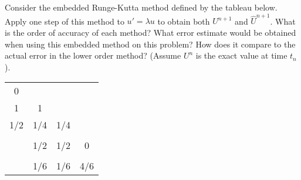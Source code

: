 

Consider the embedded Runge-Kutta method defined by the tableau below.
Apply one step of this method to 
$u' = \lambda u$ to obtain both $U^{n+1}$ and $\hat U^{n+1}$.  What is the
order of accuracy of each method?  What error estimate would be obtained
when using this embedded method on this problem?  How does it compare to the
actual error in the lower order method?  (Assume $U^n$ is the exact value at
time $t_n$).

\begin{center}
\begin{tabular}{c|ccc}
0\\
1&1\\
1/2&1/4&1/4\\
\hline\\
&1/2&1/2&0\\
\hline\\
&1/6&1/6&4/6
\end{tabular}
\end{center}

